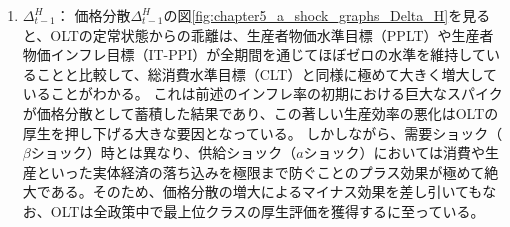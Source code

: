 \begin{enumerate}
    \item
    \label{itm:chapter5_a_shock_policies_olt_Delta_t_minus_1_H}
        \(\Delta_{t-1}^H\)：
        価格分散\(\Delta_{t-1}^H\)の図\ref{fig:chapter5_a_shock_graphs_Delta_H}を見ると、OLTの定常状態からの乖離は、生産者物価水準目標（PPLT）や生産者物価インフレ目標（IT-PPI）が全期間を通じてほぼゼロの水準を維持していることと比較して、総消費水準目標（CLT）と同様に極めて大きく増大していることがわかる。
        これは前述のインフレ率の初期における巨大なスパイクが価格分散として蓄積した結果であり、この著しい生産効率の悪化はOLTの厚生を押し下げる大きな要因となっている。
        しかしながら、需要ショック（\(\beta\)ショック）時とは異なり、供給ショック（\(a\)ショック）においては消費や生産といった実体経済の落ち込みを極限まで防ぐことのプラス効果が極めて絶大である。そのため、価格分散の増大によるマイナス効果を差し引いてもなお、OLTは全政策中で最上位クラスの厚生評価を獲得するに至っている。
\end{enumerate}